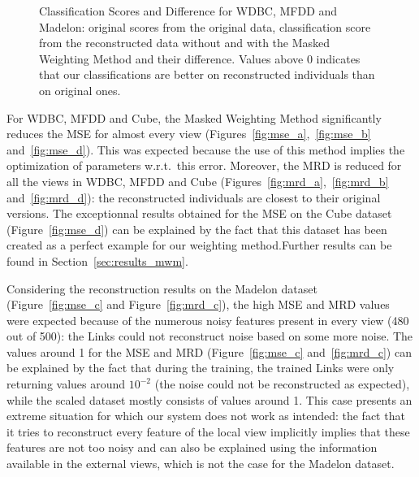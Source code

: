 \begin{figure}[h]
    \quad
    \caption{Classification Scores and Difference for WDBC, MFDD and
    Madelon: original scores from the original data, classification score from the reconstructed data without and with the Masked Weighting Method and their difference. Values above 0 indicates that our classifications are better on reconstructed individuals than on original ones.}
\end{figure}

For WDBC, MFDD and Cube, the Masked Weighting Method significantly reduces the MSE for almost every view (Figures~\ref{fig:mse_a},~\ref{fig:mse_b} and~\ref{fig:mse_d}). This was expected because the use of this method implies the optimization of parameters w.r.t.\ this error. Moreover, the MRD is reduced for all the views in WDBC, MFDD and Cube (Figures~\ref{fig:mrd_a},~\ref{fig:mrd_b} and~\ref{fig:mrd_d}): the reconstructed individuals are closest to their original versions. The exceptionnal results obtained for the MSE on the Cube dataset (Figure~\ref{fig:mse_d}) can be explained by the fact that this dataset has been created as a perfect example for our weighting method.\@ Further results can be found in Section~\ref{sec:results_mwm}.

Considering the reconstruction results on the Madelon dataset (Figure~\ref{fig:mse_c} and Figure~\ref{fig:mrd_c}), the high MSE and MRD values were expected because of the numerous noisy features present in every view (480 out of 500): the Links could not reconstruct noise based on some more noise. The values around 1 for the MSE and MRD (Figure~\ref{fig:mse_c} and~\ref{fig:mrd_c}) can be explained by the fact that during the training, the trained Links were only returning values around $10^{-2}$ (the noise could not be reconstructed as expected), while the scaled dataset mostly consists of values around 1. This case presents an extreme situation for which our system does not work as intended: the fact that it tries to reconstruct every feature of the local view implicitly implies that these features are not too noisy and can also be explained using the information available in the external views, which is not the case for the Madelon dataset.
	

